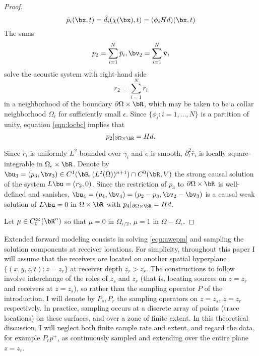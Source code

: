 \begin{proof}
\begin{equation}
  \label{eqn:locbc}
  \bar{p}_i(\bx,t) = \tilde{d}_i(\chi(\bx),t)
  =(\phi_iHd)(\bx,t)
\end{equation}
The sums
\begin{equation}
  \label{eqn:psynth2}
  p_2 = \sum_{i=1}^N\bar{p}_i, \bv_2 = \sum_{i=1}^N\bar{\bf v}_i
\end{equation}
solve the acoustic system with right-hand side
\begin{equation}
  \label{eqn:rsynth}
  r_2 = \sum_{i=1}^N\bar{r}_i
\end{equation}
in a neighborhood of the boundary $\partial \Omega \times \bR$, which
may be taken to be a collar neighborhood $\Omega_{\epsilon}$ for
sufficiently small $\epsilon$. Since $\{\phi_i: i=1,...,N\}$ is a
partition of unity, equation \ref{eqn:locbc} implies that
\begin{equation}
  \label{eqn:bc2}
  p_2|_{\partial \Omega \times \bR} = Hd.
\end{equation}

Since $\tilde{r}_i$ is uniformly $L^2$-bounded over $\gamma_i$ and
$\tilde{e}$ is smooth, $\partial_t^2\bar{r}_i$ is
locally square-integrable in $\Omega_{\epsilon}
\times \bR$. Denote by $\bu_3=(p_3,\bv_3) \in C^1(\bR,(L^2(\Omega))^{n+1})
\cap C^0(\bR,V)$ the strong causal solution of the system
$L\bu=(r_2,0)$. Since the restriction of
$p_3$ to $\partial \Omega \times \bR$ is well-defined and vanishes,
$\bu_4 = (p_4,\bv_4) = (p_2-p_3,\bv_2-\bv_3)$ is a causal weak
solution of $L\bu=0$ in $\Omega \times \bR$ with $p_4|_{\partial \Omega \times \bR}=Hd$.

 Let $\mu \in C_0^{\infty}(\bR^n)$ so that
$\mu=0$ in $\Omega_{\epsilon/2}$, $\mu=1$ in $\Omega - \Omega_{\epsilon}$. 

\end{proof}

Extended forward modeling consists in solving \ref{eqn:awepm} and
sampling the solution components at receiver locations. For
simplicity, throughout this paper I will assume that the receivers are
located on another spatial hyperplane $\{(x,y,z,t): z=z_r\}$ at
receiver depth $z_r>z_s$. The constructions to follow involve interchange
of the roles of $z_s$ and $z_r$ (that is, locating sources on $z=z_r$
and receivers at $z=z_s$), so rather than the sampling operator $P$ of
the introduction, I will denote by $P_s,P_r$ the sampling 
operators on $z=z_s$, $z=z_r$ respectively. In practice, sampling
occurs at a discrete array of points (trace locations) on these
surfaces, and over a zone of finite extent. In this theoretical
discussion, I will neglect both finite sample rate and extent, and
regard the data, for example $P_rp^+$, as continuously sampled and
extending over the entire plane $z=z_r$.

